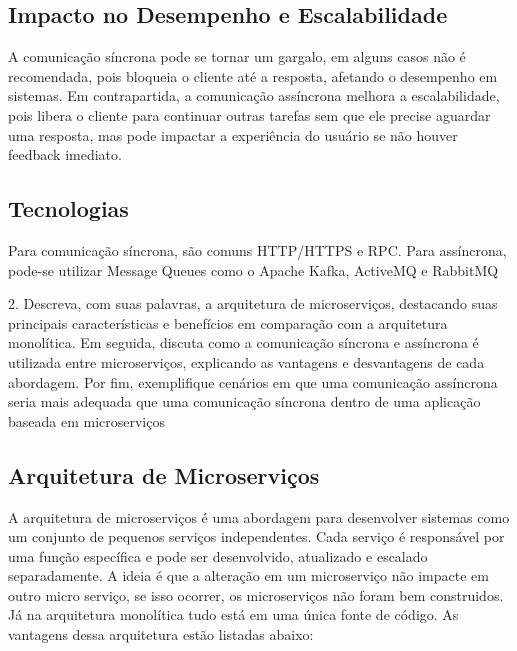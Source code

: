 \documentclass{article}
\begin{document}
	\subsection*{Impacto no Desempenho e Escalabilidade}
	A comunicação síncrona pode se tornar um gargalo, em alguns casos não é recomendada, pois bloqueia o cliente até a resposta, afetando o desempenho em sistemas. Em contrapartida, a comunicação assíncrona melhora a escalabilidade, pois libera o cliente para continuar outras tarefas sem que ele precise aguardar uma resposta, mas pode impactar a experiência do usuário se não houver feedback imediato.
	
	\subsection*{Tecnologias}
	Para comunicação síncrona, são comuns HTTP/HTTPS e RPC. Para assíncrona, pode-se utilizar Message Queues como o Apache Kafka, ActiveMQ e RabbitMQ
	
	\vspace{1cm}
	
	
	\noindent\large{2. Descreva, com suas palavras, a arquitetura de microserviços, destacando 
		suas principais características e benefícios em comparação com a arquitetura 
		monolítica. Em seguida, discuta como a comunicação síncrona e assíncrona é 
		utilizada entre microserviços, explicando as vantagens e desvantagens de cada
		abordagem. Por fim, exemplifique cenários em que uma comunicação assíncrona seria mais adequada que uma comunicação síncrona dentro de uma aplicação baseada em microserviços}
	
	
	
	\subsection*{Arquitetura de Microserviços}
	
	A arquitetura de microserviços é uma abordagem para desenvolver sistemas como um conjunto de pequenos serviços independentes. Cada serviço é responsável por uma função específica e pode ser desenvolvido, atualizado e escalado separadamente. A ideia é que a alteração em um microserviço não impacte em outro micro serviço, se isso ocorrer, os microserviços não foram bem construidos. Já na arquitetura monolítica tudo está em uma única fonte de código. As vantagens dessa arquitetura estão listadas abaixo:
	
\end{document}
